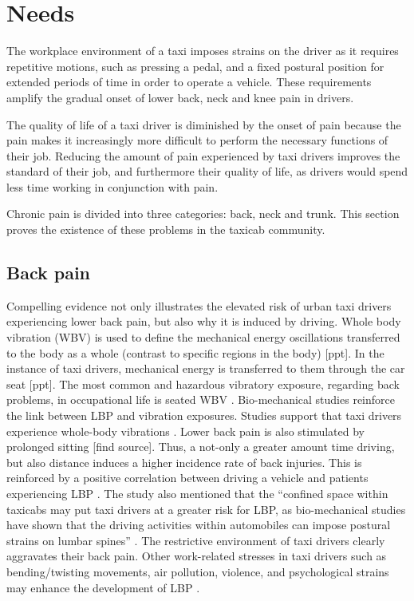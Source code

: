 \documentclass[11pt]{article}
\begin{document}
\section{Needs}
\label{sec:needs}
The workplace environment of a taxi imposes strains on the driver as it
requires repetitive motions, such as pressing a pedal, and a fixed postural
position for extended periods of time in order to operate a
vehicle. These requirements amplify the gradual onset of lower
back, neck and knee pain in drivers\cite{POSTULATED}. 

The quality of life of a taxi driver is diminished
by the onset of pain because the pain makes it increasingly more difficult to perform the 
necessary functions of their job. Reducing the amount of pain
experienced by taxi drivers improves the standard of their job, and
furthermore their quality of life, as drivers would spend
less time working in conjunction with pain.

Chronic pain is divided into three categories: back, neck and trunk.
This section proves the existence of these problems in the taxicab community.

\subsection{Back pain}
Compelling evidence not only illustrates the elevated risk of urban
taxi drivers experiencing lower back pain, but also why it is induced
by driving. Whole body vibration (WBV) is used to define the
mechanical energy oscillations transferred to the body as a whole
(contrast to specific regions in the body) [ppt]. In the instance of
taxi drivers, mechanical energy is transferred to them through the car
seat [ppt]. The most common and hazardous vibratory exposure,
regarding back problems, in occupational life is seated WBV
\cite{ODrivers@Risk}. Bio-mechanical studies reinforce the link
between LBP and vibration exposures. Studies support that taxi drivers
experience whole-body vibrations \cite{KneePain, Serious}. Lower back
pain is also stimulated by prolonged sitting [find source]. Thus, a
not-only a greater amount time driving, but also distance induces a
higher incidence rate of back injuries\cite{Question?}. This is
reinforced by a positive correlation between driving a vehicle and
patients experiencing LBP \cite{ODrivers@Risk}. The study also
mentioned that the “confined space within taxicabs may put taxi
drivers at a greater risk for LBP, as bio-mechanical studies have
shown that the driving activities within automobiles can impose
postural strains on lumbar spines” \cite{KneePain}. The restrictive
environment of taxi drivers clearly aggravates their back pain. Other
work-related stresses in taxi drivers such as bending/twisting
movements, air pollution, violence, and psychological strains may
enhance the development of LBP \cite{KneePain, POSTULATED}. 
\end{document}
